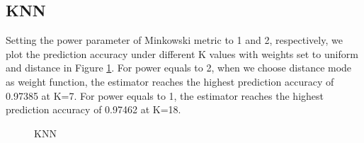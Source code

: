 \documentclass[10pt,journal,compsoc]{IEEEtran}
\begin{document}
\subsection{KNN}
\label{subsec:eva_knn}
Setting the power parameter of Minkowski metric to 1 and 2, respectively, we plot the prediction accuracy under different K values with weights set to uniform and distance in Figure \ref{fig:knn}. For power equals to 2, when we choose distance mode as weight function, the estimator reaches the highest prediction accuracy of 0.97385 at K=7. For power equals to 1, the estimator reaches the highest prediction accuracy of 0.97462 at K=18.

\begin{figure}[!t]
  \centering
\caption{KNN}
\label{fig:knn}
\end{figure}
\end{document}
